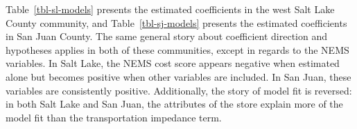 \documentclass[
  letterpaper,
  number,
  review,
  3p]{elsarticle}
\providecommand{\DIFaddbeginFL}{} %
\providecommand{\DIFaddendFL}{} %
\providecommand{\DIFdelendFL}{} %
\newcommand{\DIFaddincludegraphics}[2][]{{\color{blue}\fbox{\DIFOincludegraphics[#1]{#2}}}} %
\DeclareRobustCommand{\DIFaddbeginFL}{\DIFOaddbeginFL \let\includegraphics\DIFaddincludegraphics} %
\DeclareRobustCommand{\DIFaddendFL}{\DIFOaddendFL \let\includegraphics\DIFOincludegraphics} %
\DeclareRobustCommand{\DIFdelendFL}{\DIFOaddendFL \let\includegraphics\DIFOincludegraphics} %
\begin{document}
\begin{table}
\DIFdelendFL \DIFaddbeginFL {}
\DIFaddendFL 

\end{table}%

Table~\ref{tbl-sl-models} presents the estimated coefficients in the
west Salt Lake County community, and Table~\ref{tbl-sj-models} presents
the estimated coefficients in San Juan County. The same general story
about coefficient direction and hypotheses applies in both of these
communities, except in regards to the NEMS variables. In Salt Lake, the
NEMS cost score appears negative when estimated alone but becomes
positive when other variables are included. In San Juan, these variables
are consistently positive. Additionally, the story of model fit is
reversed: in both Salt Lake and San Juan, the attributes of the store
explain more of the model fit than the transportation impedance term.
\end{document}
